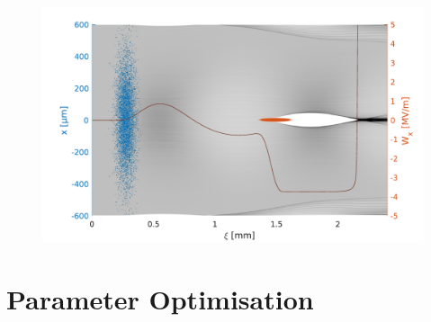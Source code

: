 \documentclass[aps,prstab,reprint,amsmath,amssymb,groupedaddress]{revtex4-1}
\begin{document}

\begin{figure}
    \includegraphics[width=0.99\linewidth,trim={4mm 0mm 4mm 0mm},clip]{figures/plasmaDenTWake}
    \label{Fig:PlasmaDenTWake}
    \caption{}
\end{figure}










\section[\label{S:PO}]{Parameter Optimisation}
\end{document}
